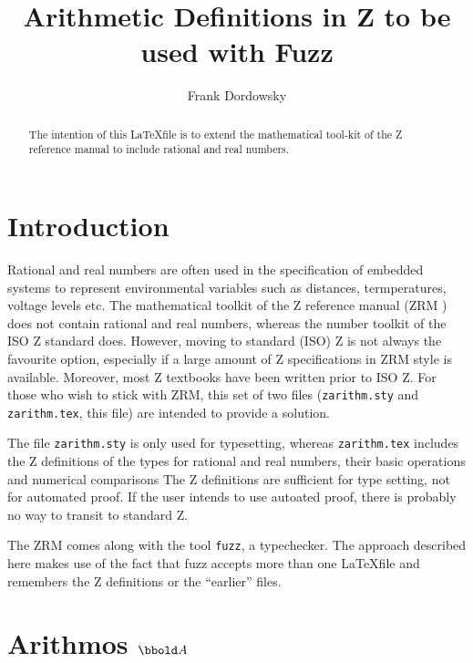 \documentclass[12pt]{article}
\begin{document}
\title{Arithmetic Definitions in  Z to be used with Fuzz}

\author{Frank Dordowsky}

\maketitle

\begin{abstract}
The intention of this \LaTeX file is to extend the mathematical
tool-kit of the Z reference manual to include rational and real
numbers. 
\end{abstract}


\section{Introduction}
\label{sec:intro}
Rational and real numbers are often used in the specification of
embedded systems to represent environmental variables such as
distances, termperatures, voltage levels etc. The mathematical toolkit
of the Z reference manual (ZRM \cite{Spivey1998}) does not contain
rational and real numbers, whereas the number toolkit of the ISO Z
standard does. However, moving to standard (ISO) Z \cite{ISO13568} is
not always the favourite option, especially if a large amount of Z
specifications in ZRM style is available. Moreover, most Z textbooks
have been written prior to ISO Z. For those who wish to stick with
ZRM, this set of two files (\texttt{zarithm.sty} and
\texttt{zarithm.tex}, this file) are intended to provide a solution.

The file \texttt{zarithm.sty} is only used for typesetting, whereas
\texttt{zarithm.tex} includes the Z definitions of the types for
rational and real numbers, their basic operations and numerical
comparisons The Z definitions are sufficient for type setting, not for
automated proof. If the user intends to use autoated proof, there is
probably no way to transit to standard Z.

The ZRM comes along with the tool \texttt{fuzz}, a typechecker. The
approach described here makes use of the fact that fuzz accepts more
than one \LaTeX file and remembers the Z definitions or the
``earlier'' files.

\section{Arithmos $\arithmos$}
\label{sec:arithmos}
\end{document}
